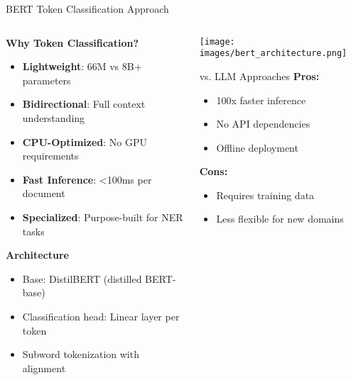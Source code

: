 \documentclass[aspectratio=169]{beamer}
\begin{document}
\begin{frame}{BERT Token Classification Approach}
\begin{columns}
\begin{column}{0.6\textwidth}
\textbf{Why Token Classification?}
\begin{itemize}
\item \textbf{Lightweight}: 66M vs 8B+ parameters
\item \textbf{Bidirectional}: Full context understanding
\item \textbf{CPU-Optimized}: No GPU requirements
\item \textbf{Fast Inference}: <100ms per document
\item \textbf{Specialized}: Purpose-built for NER tasks
\end{itemize}

\vspace{0.3cm}
\textbf{Architecture}
\begin{itemize}
\item Base: DistilBERT (distilled BERT-base)
\item Classification head: Linear layer per token
\item Subword tokenization with alignment
\end{itemize}
\end{column}
\begin{column}{0.4\textwidth}
\begin{center}
\texttt{[image: images/bert\_architecture.png]}
\caption{BERT Token Classification}
\end{center}

\vspace{0.3cm}
\begin{block}{vs. LLM Approaches}
\textbf{Pros:}
\begin{itemize}
\item 100x faster inference
\item No API dependencies
\item Offline deployment
\end{itemize}
\textbf{Cons:}
\begin{itemize}
\item Requires training data
\item Less flexible for new domains
\end{itemize}
\end{block}
\end{column}
\end{columns}
\end{frame}
\end{document}
